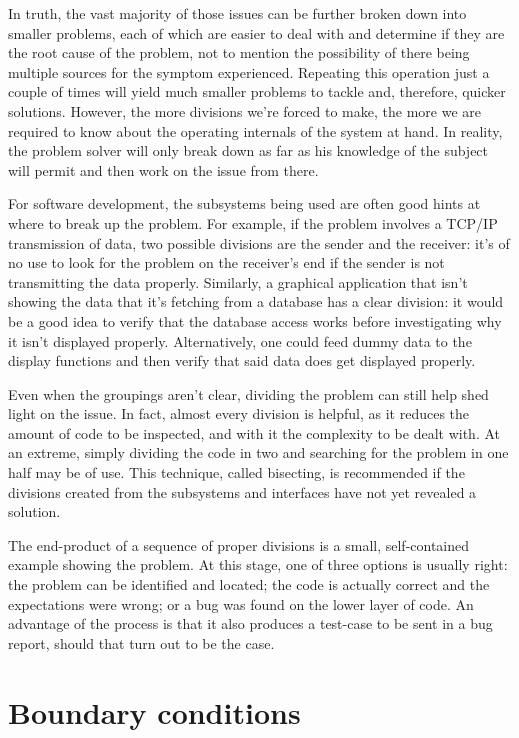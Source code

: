 In truth, the vast majority of those issues can be further broken down into smaller problems, each of which are easier to deal with and determine if they are the root cause of the problem, not to mention the possibility of there being multiple sources for the symptom experienced. Repeating this operation just a couple of times will yield much smaller problems to tackle and, therefore, quicker solutions. However, the more divisions we’re forced to make, the more we are required to know about the operating internals of the system at hand. In reality, the problem solver will only break down as far as his knowledge of the subject will permit and then work on the issue from there.

For software development, the subsystems being used are often good hints at where to break up the problem. For example, if the problem involves a TCP/IP transmission of data, two possible divisions are the sender and the receiver: it’s of no use to look for the problem on the receiver’s end if the sender is not transmitting the data properly. Similarly, a graphical application that isn’t showing the data that it’s fetching from a database has a clear division: it would be a good idea to verify that the database access works before investigating why it isn’t displayed properly. Alternatively, one could feed dummy data to the display functions and then verify that said data does get displayed properly. 

Even when the groupings aren’t clear, dividing the problem can still help shed light on the issue. In fact, almost every division is helpful, as it reduces the amount of code to be inspected, and with it the complexity to be dealt with. At an extreme, simply dividing the code in two and searching for the problem in one half may be of use. This technique, called bisecting, is  recommended if the divisions created from the subsystems and interfaces have not yet revealed a solution.

The end-product of a sequence of proper divisions is a small, self-contained example showing the problem. At this stage, one of three options is usually right: the problem can be identified and located; the code is actually correct and the expectations were wrong; or a bug was found on the lower layer of code. An advantage of the process is that it also produces a test-case to be sent in a bug report, should that turn out to be the case.

\section*{Boundary conditions}

